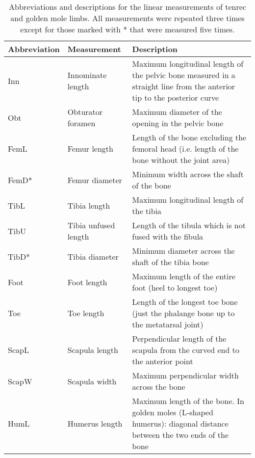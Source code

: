 \begin{center}
\begin{longtable} {lp{}p{}}
\caption[Limb measurements] {Abbreviations and descriptions for the linear measurements of tenrec and golden mole limbs. All measurements were repeated three times except for those marked with * that were measured five times.} \\

\hline
\textbf{Abbreviation} & \textbf{Measurement} & \textbf{Description}\\
\hline
Inn & Innominate length & Maximum longitudinal length of the pelvic bone measured in a straight line from the anterior tip to the posterior curve\\ 
Obt & Obturator foramen & Maximum diameter of the opening in the pelvic bone\\
FemL & Femur length & Length of the bone excluding the femoral head (i.e. length of the bone without the joint area)\\
FemD* & Femur diameter & Minimum width across the shaft of the bone\\
TibL & Tibia length & Maximum longitudinal length of the tibia\\
TibU & Tibia unfused length & Length of the tibula which is not fused with the fibula\\
TibD* & Tibia diameter & Minimum diameter across the shaft of the tibia bone\\
Foot & Foot length & Maximum length of the entire foot (heel to longest toe)\\
Toe & Toe length & Length of the longest toe bone (just the phalange bone up to the metatarsal joint)\\
ScapL & Scapula length & Perpendicular length of the scapula from the curved end to the anterior point\\
ScapW & Scapula width & Maximum perpendicular width across the bone\\
HumL & Humerus length & Maximum length of the bone. In golden moles (L-shaped humerus): diagonal distance between the two ends of the bone\\

\end{longtable}
\end{center}
